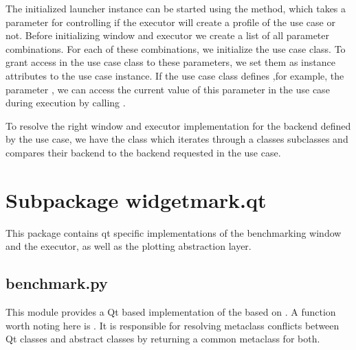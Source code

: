 The initialized launcher instance can be started using the
 method, which takes a parameter
 for controlling if the executor will create a
profile of the use case or not. Before initializing window and executor we
create a list of all parameter combinations. For each of these 
combinations, we initialize the use case class. To grant access in the use case
class to these parameters, we set them as instance attributes to the 
use case instance. If the use case class defines ,for example, the parameter
, we can access the current value of this
parameter in the use case during execution by calling 
.



To resolve the right window and executor implementation for the backend defined
by the use case, we have the class  which
iterates through a classes subclasses and compares their backend to the backend
requested in the use case.





\section{Subpackage widgetmark.qt}

This package contains qt specific implementations of the benchmarking window and
the executor, as well as the plotting abstraction layer.

\subsection{benchmark.py}

This module provides a Qt based implementation of the
 based on 
. A function worth noting here is
. It is responsible for resolving
metaclass conflicts between Qt classes and abstract classes by returning a
common metaclass for both.



